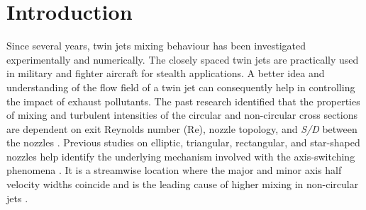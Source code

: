 \documentclass[Afour,sagev,times]{sagej}
\begin{document}
\section{Introduction}
Since several years, twin jets mixing behaviour has been investigated experimentally and numerically. The closely spaced twin jets are practically used in military and fighter aircraft for stealth applications. A better idea and understanding of the flow field of a twin jet can consequently help in controlling the impact of exhaust pollutants. The past research identified that the properties of mixing and turbulent intensities of the circular and non-circular cross sections are dependent on exit Reynolds number (Re), nozzle topology, and \textit{S/D} between the nozzles \cite{deo2008influence,harima2005turbulent}. Previous studies on elliptic, triangular, rectangular, and star-shaped nozzles help identify the underlying mechanism involved with the axis-switching phenomena \cite{mi2010statistical,quinn2007experimental,quinn2005measurements,xu2014effect,aleyasin2015low}. It is a streamwise location where the major and minor axis half velocity widths coincide and is the leading cause of higher mixing in non-circular jets \cite{aleyasin2015low}.  
\end{document}
